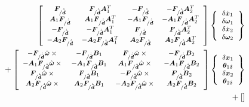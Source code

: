\documentclass[10pt,dvips,fleqn,subeqn]{report}
\newcommand{\T}[1]{\bm{#1}}
\newcommand{\TT}[1]{\bm{#1}}
\begin{document}
\begin{align}
	\footnotesize
	\sqbr{\matr{cccc}{
		\T{F}_{/\dot{\tilde{\T{d}}}} 
		& \T{F}_{/\dot{\tilde{\T{d}}}} \TT{A}_1^T
		& - \T{F}_{/\dot{\tilde{\T{d}}}}
		& - \T{F}_{/\dot{\tilde{\T{d}}}} \TT{A}_2^T \\
%
		\TT{A}_1 \T{F}_{/\dot{\tilde{\T{d}}}} 
		& \TT{A}_1 \T{F}_{/\dot{\tilde{\T{d}}}} \TT{A}_1^T
		& - \TT{A}_1 \T{F}_{/\dot{\tilde{\T{d}}}}
		& - \TT{A}_1 \T{F}_{/\dot{\tilde{\T{d}}}} \TT{A}_2^T \\
%
		- \T{F}_{/\dot{\tilde{\T{d}}}} 
		& - \T{F}_{/\dot{\tilde{\T{d}}}} \TT{A}_1^T
		& \T{F}_{/\dot{\tilde{\T{d}}}}
		& \T{F}_{/\dot{\tilde{\T{d}}}} \TT{A}_2^T \\
%
		- \TT{A}_2 \T{F}_{/\dot{\tilde{\T{d}}}} 
		& - \TT{A}_2 \T{F}_{/\dot{\tilde{\T{d}}}} \TT{A}_1^T
		& \TT{A}_2 \T{F}_{/\dot{\tilde{\T{d}}}}
		& \TT{A}_2 \T{F}_{/\dot{\tilde{\T{d}}}} \TT{A}_2^T
	}} \cubr{\cvvect{
		\delta\dot{\T{x}}_1 \\
		\delta\T{\omega}_1 \\
		\delta\dot{\T{x}}_2 \\
		\delta\T{\omega}_2
	}} & \nonumber \\
	\footnotesize
	\mbox{} + \sqbr{\matr{cccc}{
		- \T{F}_{/\dot{\tilde{\T{d}}}} \hat{\T{\omega}}\times{}
		& - \T{F}_{/\dot{\tilde{\T{d}}}} \TT{B}_1
		& \T{F}_{/\dot{\tilde{\T{d}}}} \hat{\T{\omega}}\times{}
		& - \T{F}_{/\dot{\tilde{\T{d}}}} \TT{B}_2 \\
%
		- \TT{A}_1 \T{F}_{/\dot{\tilde{\T{d}}}} \hat{\T{\omega}}\times{}
		& - \TT{A}_1 \T{F}_{/\dot{\tilde{\T{d}}}} \TT{B}_1
		& \TT{A}_1 \T{F}_{/\dot{\tilde{\T{d}}}} \hat{\T{\omega}}\times{}
		& - \TT{A}_1 \T{F}_{/\dot{\tilde{\T{d}}}} \TT{B}_2 \\
%
		\T{F}_{/\dot{\tilde{\T{d}}}} \hat{\T{\omega}}\times{}
		& \T{F}_{/\dot{\tilde{\T{d}}}} \TT{B}_1
		& - \T{F}_{/\dot{\tilde{\T{d}}}} \hat{\T{\omega}}\times{}
		& \T{F}_{/\dot{\tilde{\T{d}}}} \TT{B}_2 \\
%
		\TT{A}_2 \T{F}_{/\dot{\tilde{\T{d}}}} \hat{\T{\omega}}\times{}
		& \TT{A}_2 \T{F}_{/\dot{\tilde{\T{d}}}} \TT{B}_1
		& - \TT{A}_2 \T{F}_{/\dot{\tilde{\T{d}}}} \hat{\T{\omega}}\times{}
		& \TT{A}_2 \T{F}_{/\dot{\tilde{\T{d}}}} \TT{B}_2
	}}\cubr{\cvvect{
		\delta\T{x}_1 \\
		\T{\theta}_{1\delta} \\
		\delta\T{x}_2 \\
		\T{\theta}_{2\delta}
	}} & \nonumber \\
	\footnotesize
	\mbox{} + \sqbr{\matr{cccc}{
}}
\end{align}
\end{document}
